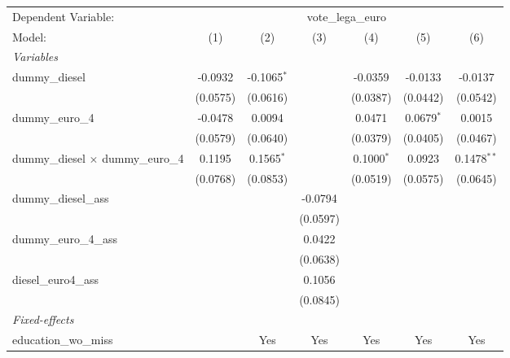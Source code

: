 \begingroup
\centering
\begin{tabular}{lcccccc}
   \tabularnewline \midrule \midrule
   Dependent Variable: & \multicolumn{6}{c}{vote\_lega\_euro}\\
   Model:                                    & (1)      & (2)           & (3)      & (4)          & (5)          & (6)\\  
   \midrule
   \emph{Variables}\\
   dummy\_diesel                             & -0.0932  & -0.1065$^{*}$ &          & -0.0359      & -0.0133      & -0.0137\\   
                                             & (0.0575) & (0.0616)      &          & (0.0387)     & (0.0442)     & (0.0542)\\   
   dummy\_euro\_4                            & -0.0478  & 0.0094        &          & 0.0471       & 0.0679$^{*}$ & 0.0015\\   
                                             & (0.0579) & (0.0640)      &          & (0.0379)     & (0.0405)     & (0.0467)\\   
   dummy\_diesel $\times$ dummy\_euro\_4     & 0.1195   & 0.1565$^{*}$  &          & 0.1000$^{*}$ & 0.0923       & 0.1478$^{**}$\\   
                                             & (0.0768) & (0.0853)      &          & (0.0519)     & (0.0575)     & (0.0645)\\   
   dummy\_diesel\_ass                        &          &               & -0.0794  &              &              &   \\   
                                             &          &               & (0.0597) &              &              &   \\   
   dummy\_euro\_4\_ass                       &          &               & 0.0422   &              &              &   \\   
                                             &          &               & (0.0638) &              &              &   \\   
   diesel\_euro4\_ass                        &          &               & 0.1056   &              &              &   \\   
                                             &          &               & (0.0845) &              &              &   \\   
   \midrule
   \emph{Fixed-effects}\\
   education\_wo\_miss                       &          & Yes           & Yes      & Yes          & Yes          & Yes\\  

\end{tabular}
